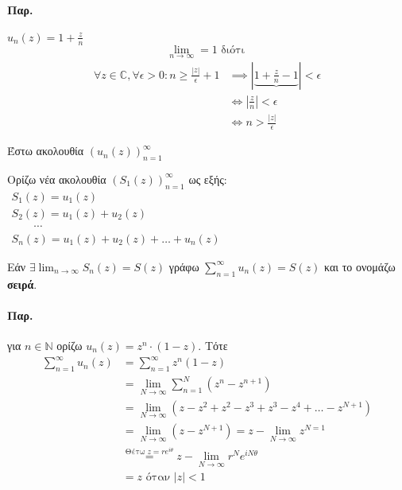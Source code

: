 \documentclass[12pt,a4paper,titlepage,fleqn]{article}
\begin{document}
     \paragraph{Παρ.}
     \( u_n(z) = 1 +\frac{z}{n} \)
     \[ \lim_{n\to \infty} = 1 \text{ διότι } \]
     \begin{align*}
     \forall z\in\mathbb C , \forall \epsilon >0:
     n \geq \frac{|z|}{\epsilon}+1 &\implies \left|
     \underbrace{1+\frac{z}{n}-1}
     \right| < \epsilon \\ &\iff \left| \frac{z}{n} \right| < \epsilon
     \\ &\iff n> \frac{|z|}{\epsilon}
     \end{align*}
     \begin{defn*}{}
     	Έστω ακολουθία \( \left(u_n(z)\right)_{n=1}^\infty \)
     	
     	Ορίζω νέα ακολουθία \( \left( S_1(z) \right)_{n=1}^\infty \)
     	ως εξής: \( \begin{array}{l}
     		S_1(z) = u_1(z) \\
     		S_2(z) = u_1(z)+u_2(z) \\
     		\qquad \cdots \qquad \\
     		S_n(z) = u_1(z)+u_2(z)+\dots+u_n(z)
     	\end{array} \)
     	
     	Εάν \(\displaystyle \exists \lim_{n\to \infty} S_n(z) = S(z) \)
     	γράφω \( \displaystyle \sum_{n=1}^\infty u_n(z)=S(z) \) και το
     	ονομάζω \textbf{σειρά}.
     \end{defn*}
     
     \paragraph{Παρ.}
     για \( n\in\mathbb N \) ορίζω \( u_n(z)=z^n\cdot (1-z) \). Τότε
     \begin{align*}
     \sum_{n=1}^\infty u_n(z) &= \sum_{n=1}^\infty z^n(1-z)
     \\ &= \lim_{N\to \infty} \sum_{n=1}^N \left( z^n - z^{n+1} \right)
     \\ &= \lim_{N\to\infty}\left(z-z^2+z^2-z^3+z^3-z^4+\dots-z^{N+1}\right)
     \\ &= \lim_{N\to\infty}\left(z-z^{N+1}\right) = z-\lim_{N\to \infty} z^{N=1}
     \\ &\overset{\text{Θέτω } z=re^{i\theta}}{=} z-\lim_{N\to \infty} r^Ne^{iN\theta}
     \\ &= z \text{ όταν } |z|<1
     \end{align*}
     
\end{document}
